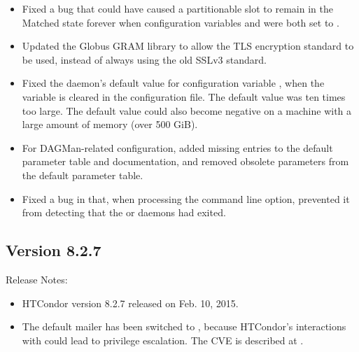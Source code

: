 \begin{itemize}
\item Fixed a bug that could have caused a partitionable slot to remain in
the Matched state forever when configuration variables
 and 
were both set to .

\item Updated the Globus GRAM library to allow the TLS encryption standard
to be used, instead of always using the old SSLv3 standard.

\item Fixed the  daemon's default value for configuration 
variable , 
when the variable is cleared in the configuration file.
The default value was ten times too large.
The default value could also become negative on a machine with a large
amount of memory (over 500 GiB).

\item For DAGMan-related configuration,
added missing entries to the default parameter table and documentation,
and removed obsolete parameters from the default parameter table.

\item Fixed a bug in  that, 
when processing the  command line option,
prevented it from detecting that the 
 or  daemons had exited.

\end{itemize}

\subsection*{\label{sec:New-8-2-7}Version 8.2.7}

\noindent Release Notes:

\begin{itemize}

\item HTCondor version 8.2.7 released on Feb. 10, 2015.

\item \Security The default mailer has been switched to ,
because HTCondor's interactions with  could lead
to privilege escalation.
The CVE is described at
.

\end{itemize}


